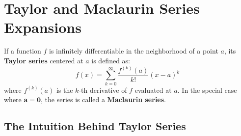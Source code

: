 \section{Taylor and Maclaurin Series Expansions}

\begin{definitionbox}
If a function $f$ is infinitely differentiable in the neighborhood of a point $a$, its \textbf{Taylor series} centered at $a$ is defined as:
$$ f(x) = \sum_{k=0}^{\infty} \frac{f^{(k)}(a)}{k!} (x-a)^k $$
where $f^{(k)}(a)$ is the $k$-th derivative of $f$ evaluated at $a$.
\newline
\newline
In the special case where $\mathbf{a=0}$, the series is called a \textbf{Maclaurin series}.
\end{definitionbox}

\subsection{The Intuition Behind Taylor Series}

